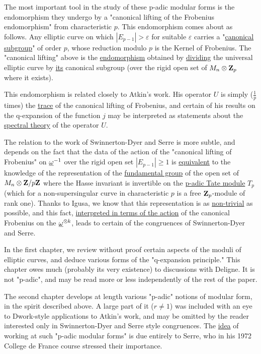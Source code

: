 The most important tool in the study of these p-adic modular forms is the
endomorphism they undergo by a "canonical lifting of the Frobenius
endomorphism" from characteristic $p$. This endomorphism comes about as
follows. Any elliptic curve on which $|E_{p-1}|>\varepsilon$ for suitable
$\varepsilon$ carries a "\uline{canonical subgroup}" of order $p$, whose
reduction modulo $p$ is the Kernel of Frobenius. The "canonical lifting" above
is the \uline{endomorphism} obtained by \uline{dividing} the universal elliptic
curve by \uline{its} canonical subgroup (over the rigid open set of
$M_n\otimes\mathbf{Z}_p$ where it exists).

This endomorphism is related closely to Atkin's work. His operator $U$ is
simply ($\tfrac1p$ times) the \uline{trace} of the canonical lifting of
Frobenius, and certain of his results on the q-expansion of the function $j$
may be interpreted as statements about the \uline{spectral theory} of the
operator $U$.

The relation to the work of Swinnerton-Dyer and Serre is more subtle, and
depends on the fact that the data of the action of the "canonical lifting of
Frobenius" on $\underline{\omega}^{-1}$ over the rigid open set $|E_{p-1}|\geq 1$ is
\uline{equivalent} to the knowledge of the representation of the
\uline{fundamental group} of the open set of $M_n\otimes\mathbf{Z}/p\mathbf{Z}$ where the Hasse
invariant is invertible on the \uline{p-adic Tate module} $T_p$ (which for a
non-supersingular curve in characteristic $p$ is a free $\mathbf{Z}_p$-module of rank
one). Thanks to Igusa, we know that this representation is as
\uline{non-trivial} as possible, and this fact, \uline{interpreted in terms of
the action} of the canonical Frobenius on the $\underline{\omega}^{\otimes k}$, leads to certain
of the congruences of Swinnerton-Dyer and Serre.

In the first chapter, we review without proof certain aspects of the moduli of
elliptic curves, and deduce various forms of the "q-expansion principle."
This chapter owes much (probably its very existence) to discussions with
Deligne. It is not "p-adic", and may be read more or less independently of the
rest of the paper.

The second chapter develops at length various "p-adic" notions of modular
form, in the spirit described above. A large part of it ($r\neq 1$) was
included with an eye to Dwork-style applications to Atkin's work, and may be
omitted by the reader interested only in Swinnerton-Dyer and Serre style
congruences. The \uline{idea} of working at such "p-adic modular forms" is due
entirely to Serre, who in his 1972 College de France course stressed their
importance.

